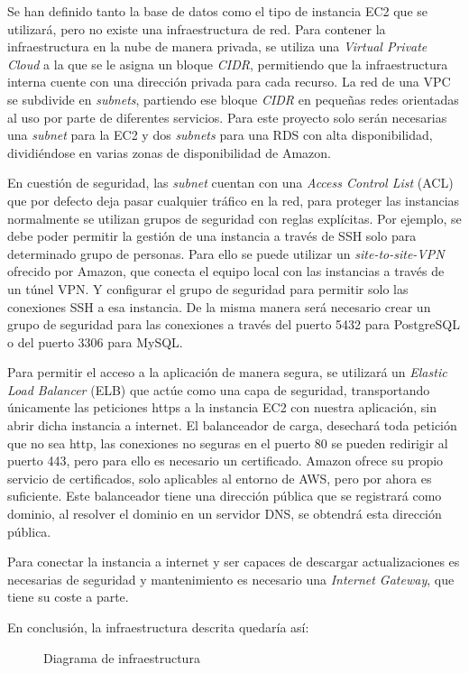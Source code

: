 Se han definido tanto la base de datos como el tipo de instancia \gls{EC2} que se utilizará, pero no existe una infraestructura de red. Para contener la infraestructura en la nube de manera privada, se utiliza una \textit{Virtual Private Cloud} a la que se le asigna un bloque \textit{\gls{CIDR}}, permitiendo que la infraestructura interna cuente con una dirección privada para cada recurso. La red de una VPC se subdivide en \textit{subnets}, partiendo ese bloque \textit{\gls{CIDR}} en pequeñas redes orientadas al uso por parte de diferentes servicios. Para este proyecto solo serán necesarias una \textit{subnet} para la \gls{EC2} y dos \textit{subnets} para una \gls{RDS} con alta disponibilidad, dividiéndose en varias zonas de disponibilidad de Amazon. 

En cuestión de seguridad, las \textit{subnet} cuentan con una \textit{Access Control List} (\gls{ACL}) que por defecto deja pasar cualquier tráfico en la red, para proteger las instancias normalmente se utilizan grupos de seguridad con reglas explícitas. Por ejemplo, se debe poder permitir la gestión de una instancia a través de \gls{SSH} solo para determinado grupo de personas. Para ello se puede utilizar un \textit{site-to-site-VPN} ofrecido por Amazon, que conecta el equipo local con las instancias a través de un túnel \gls{VPN}. Y configurar el grupo de seguridad para permitir solo las conexiones \gls{SSH} a esa instancia. De la misma manera será necesario crear un grupo de seguridad para las conexiones a través del puerto 5432 para PostgreSQL o del puerto 3306 para MySQL.

Para permitir el acceso a la aplicación de manera segura, se utilizará un \emph{Elastic Load Balancer} (\gls{ELB}) que actúe como una capa de seguridad, transportando únicamente las peticiones \glspl{http} a la instancia \gls{EC2} con nuestra aplicación, sin abrir dicha instancia a internet. El balanceador de carga, desechará toda petición que no sea \gls{http}, las conexiones no seguras en el puerto 80 se pueden redirigir al puerto 443, pero para ello es necesario un certificado. Amazon ofrece su propio servicio de certificados, solo aplicables al entorno de \gls{AWS}, pero por ahora es suficiente. Este balanceador tiene una dirección pública que se registrará como dominio, al resolver el dominio en un servidor \gls{DNS}, se obtendrá esta dirección pública. 

Para conectar la instancia a internet y ser capaces de descargar actualizaciones es necesarias de seguridad y mantenimiento es necesario una \textit{Internet Gateway}, que tiene su coste a parte. 

En conclusión, la infraestructura descrita quedaría así:
\begin{figure}[H]
    \caption{Diagrama de infraestructura}
    \label{fig:infra}
\end{figure}